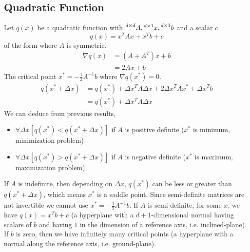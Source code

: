 \documentclass{book}
\numberwithin{equation}{subsection}
\begin{document}
\subsection{Quadratic Function}
Let $q(x)$ be a quadratic function with $\prescript{d \times d}{}{A}, \prescript{d \times 1}{}{x}, \prescript{d \times 1}{}{b}$ and a scalar $c$
\begin{equation}
    q(x) = x^TAx+x^Tb+c
\end{equation}
of the form where $A$ is symmetric.
\begin{align}
    \nabla q(x) &= (A+A^T)x+b\\
     &= 2Ax+b
\end{align}
The critical point $x^* = -\frac{1}{2}A^{-1}b$ where $\nabla q(x^*) = 0$.
\begin{align}
    q(x^*+\Delta x) &= q(x^*) + \Delta x^TA\Delta x + 2\Delta x^TAx^* + \Delta x^Tb\\
    &= q(x^*) + \Delta x^TA\Delta x
\end{align}
We can deduce from previous results, 
\begin{itemize}
    \item $\forall \Delta x [q(x^*) < q(x^*+\Delta x)]$ if $A$ is positive definite ($x^*$ is minimum, minimization problem)
    \item $\forall \Delta x [q(x^*) > q(x^*+\Delta x)]$ if $A$ is negative definite ($x^*$ is maximum, maximization problem)
    \label{posneg}
\end{itemize}
If $A$ is indefinite, then depending on $\Delta x$, $q(x^*)$ can be less or greater than $q(x^*+\Delta x)$, which means $x^*$ is a saddle point. Since semi-definite matrices are not invertible we cannot use $x^* = -\frac{1}{2}A^{-1}b$. If $A$ is semi-definite, for some $x$, we have $q(x) = x^Tb+c$ (a hyperplane with a $d+1$-dimensional normal having scalars of $b$ and having $1$ in the dimension of a reference axis, i.e. inclined-plane). If $b$ is zero, then we have infinitely many critical points (a hyperplane with a normal along the reference axis, i.e. ground-plane).
\end{document}
